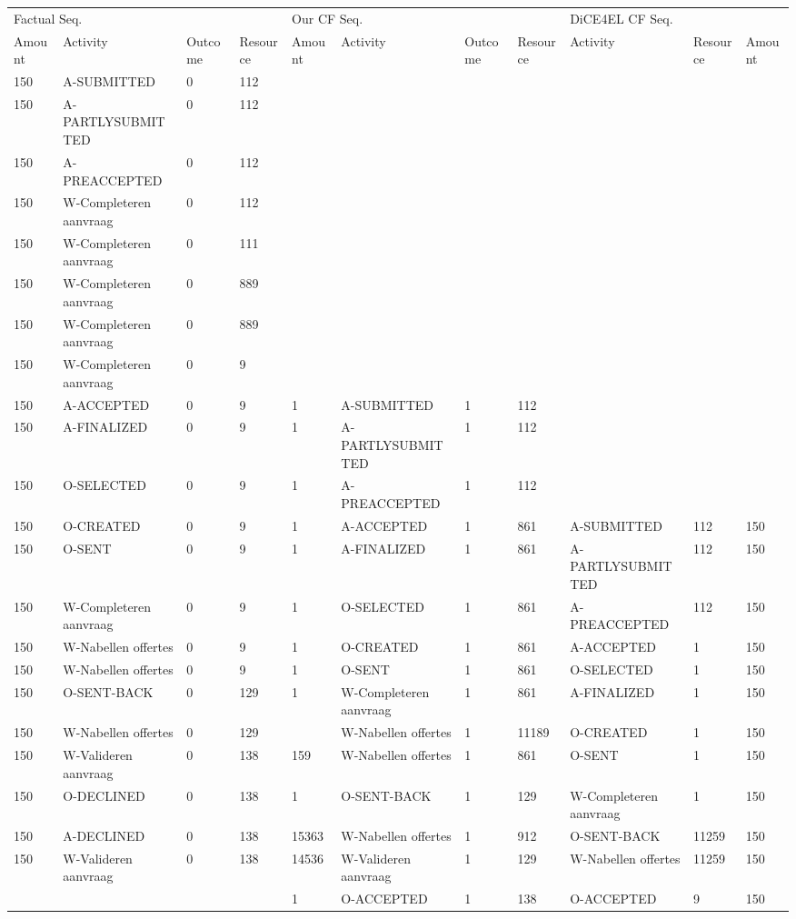 \begin{tabular}{lllllllllll}
\toprule
\multicolumn{4}{l}{Factual Seq.} & \multicolumn{4}{l}{Our CF Seq.} & \multicolumn{3}{l}{DiCE4EL CF Seq.} \\
Amount & Activity & Outcome & Resource & Amount & Activity & Outcome & Resource & Activity & Resource & Amount \\
\midrule
150 & A-SUBMITTED & 0 & 112 &  &  &  &  &  &  &  \\
150 & A-PARTLYSUBMITTED & 0 & 112 &  &  &  &  &  &  &  \\
150 & A-PREACCEPTED & 0 & 112 &  &  &  &  &  &  &  \\
150 & W-Completeren aanvraag & 0 & 112 &  &  &  &  &  &  &  \\
150 & W-Completeren aanvraag & 0 & 111 &  &  &  &  &  &  &  \\
150 & W-Completeren aanvraag & 0 & 889 &  &  &  &  &  &  &  \\
150 & W-Completeren aanvraag & 0 & 889 &  &  &  &  &  &  &  \\
150 & W-Completeren aanvraag & 0 & 9 &  &  &  &  &  &  &  \\
150 & A-ACCEPTED & 0 & 9 & 1 & A-SUBMITTED & 1 & 112 &  &  &  \\
150 & A-FINALIZED & 0 & 9 & 1 & A-PARTLYSUBMITTED & 1 & 112 &  &  &  \\
150 & O-SELECTED & 0 & 9 & 1 & A-PREACCEPTED & 1 & 112 &  &  &  \\
150 & O-CREATED & 0 & 9 & 1 & A-ACCEPTED & 1 & 861 & A-SUBMITTED & 112 & 150 \\
150 & O-SENT & 0 & 9 & 1 & A-FINALIZED & 1 & 861 & A-PARTLYSUBMITTED & 112 & 150 \\
150 & W-Completeren aanvraag & 0 & 9 & 1 & O-SELECTED & 1 & 861 & A-PREACCEPTED & 112 & 150 \\
150 & W-Nabellen offertes & 0 & 9 & 1 & O-CREATED & 1 & 861 & A-ACCEPTED & 1 & 150 \\
150 & W-Nabellen offertes & 0 & 9 & 1 & O-SENT & 1 & 861 & O-SELECTED & 1 & 150 \\
150 & O-SENT-BACK & 0 & 129 & 1 & W-Completeren aanvraag & 1 & 861 & A-FINALIZED & 1 & 150 \\
150 & W-Nabellen offertes & 0 & 129 &  & W-Nabellen offertes & 1 & 11189 & O-CREATED & 1 & 150 \\
150 & W-Valideren aanvraag & 0 & 138 & 159 & W-Nabellen offertes & 1 & 861 & O-SENT & 1 & 150 \\
150 & O-DECLINED & 0 & 138 & 1 & O-SENT-BACK & 1 & 129 & W-Completeren aanvraag & 1 & 150 \\
150 & A-DECLINED & 0 & 138 & 15363 & W-Nabellen offertes & 1 & 912 & O-SENT-BACK & 11259 & 150 \\
150 & W-Valideren aanvraag & 0 & 138 & 14536 & W-Valideren aanvraag & 1 & 129 & W-Nabellen offertes & 11259 & 150 \\
 &  &  &  & 1 & O-ACCEPTED & 1 & 138 & O-ACCEPTED & 9 & 150 \\
\bottomrule
\end{tabular}
